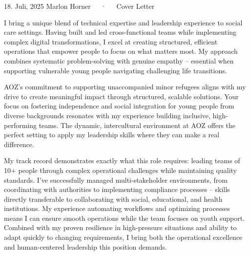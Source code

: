 \documentclass[11pt, a4paper]{awesome-cv}
\begin{document}
\makecvheader[R]

\makecvfooter
  {18. Juli, 2025}
  {Marlon Horner~~~·~~~Cover Letter}
  {}

\makelettertitle

\begin{cvletter}

I bring a unique blend of technical expertise and leadership experience to social care settings. Having built and led cross-functional teams while implementing complex digital transformations, I excel at creating structured, efficient operations that empower people to focus on what matters most. My approach combines systematic problem-solving with genuine empathy – essential when supporting vulnerable young people navigating challenging life transitions.

AOZ's commitment to supporting unaccompanied minor refugees aligns with my drive to create meaningful impact through structured, scalable solutions. Your focus on fostering independence and social integration for young people from diverse backgrounds resonates with my experience building inclusive, high-performing teams. The dynamic, intercultural environment at AOZ offers the perfect setting to apply my leadership skills where they can make a real difference.

My track record demonstrates exactly what this role requires: leading teams of 10+ people through complex operational challenges while maintaining quality standards. I've successfully managed multi-stakeholder environments, from coordinating with authorities to implementing compliance processes – skills directly transferable to collaborating with social, educational, and health institutions. My experience automating workflows and optimizing processes means I can ensure smooth operations while the team focuses on youth support. Combined with my proven resilience in high-pressure situations and ability to adapt quickly to changing requirements, I bring both the operational excellence and human-centered leadership this position demands.

\end{cvletter}


\makeletterclosing
\end{document}
